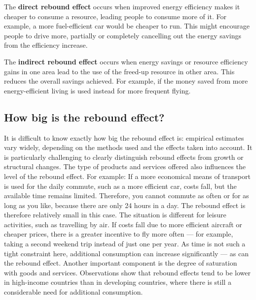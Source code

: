 \documentclass[
  a4paper,
  openany]{book}
\begin{document}
\begin{tcolorbox}[enhanced jigsaw, left=2mm, arc=.35mm, titlerule=0mm, opacityback=0, leftrule=.75mm, title={Rebound-effects}, breakable, bottomtitle=1mm, rightrule=.15mm, coltitle=black, toptitle=1mm, bottomrule=.15mm, colback=white, opacitybacktitle=0.6, colbacktitle=quarto-callout-note-color!10!white, toprule=.15mm, colframe=quarto-callout-note-color-frame]

The \textbf{direct rebound effect} occurs when improved energy
efficiency makes it cheaper to consume a resource, leading people to
consume more of it. For example, a more fuel-efficient car would be
cheaper to run. This might encourage people to drive more, partially or
completely cancelling out the energy savings from the efficiency
increase.

The \textbf{indirect rebound effect} occurs when energy savings or
resource efficiency gains in one area lead to the use of the freed-up
resource in other area. This reduces the overall savings achieved. For
example, if the money saved from more energy-efficient living is used
instead for more frequent flying.

\end{tcolorbox}

\subsection{How big is the rebound
effect?}\label{how-big-is-the-rebound-effect}

It is difficult to know exactly how big the rebound effect is: empirical
estimates vary widely, depending on the methods used and the effects
taken into account. It is particularly challenging to clearly
distinguish rebound effects from growth or structural changes. The type
of products and services offered also influences the level of the
rebound effect. For example: If a more economical means of transport is
used for the daily commute, such as a more efficient car, costs fall,
but the available time remains limited. Therefore, you cannot commute as
often or for as long as you like, because there are only 24 hours in a
day. The rebound effect is therefore relatively small in this case. The
situation is different for leisure activities, such as travelling by
air. If costs fall due to more efficient aircraft or cheaper prices,
there is a greater incentive to fly more often --- for example, taking a
second weekend trip instead of just one per year. As time is not such a
tight constraint here, additional consumption can increase significantly
--- as can the rebound effect. Another important component is the degree
of saturation with goods and services. Observations show that rebound
effects tend to be lower in high-income countries than in developing
countries, where there is still a considerable need for additional
consumption.
\end{document}
